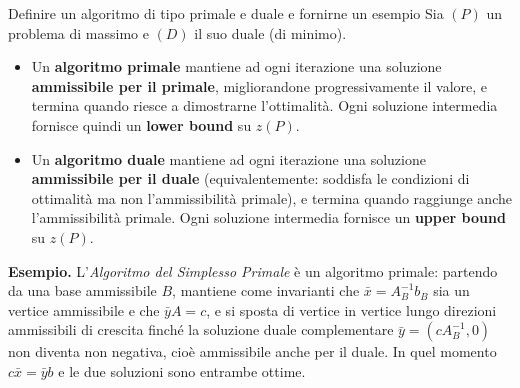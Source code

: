 \documentclass[12pt]{extarticle} %
\begin{document}
\begin{teoriabox}{Definire un algoritmo di tipo primale e duale e fornirne un esempio}
Sia $(P)$ un problema di massimo e $(D)$ il suo duale (di minimo).
\begin{itemize}
    \item Un \textbf{algoritmo primale} mantiene ad ogni iterazione una soluzione \textbf{ammissibile per il primale}, migliorandone progressivamente il valore, e termina quando riesce a dimostrarne l'ottimalità. Ogni soluzione intermedia fornisce quindi un \textbf{lower bound} su $z(P)$.
    \item Un \textbf{algoritmo duale} mantiene ad ogni iterazione una soluzione \textbf{ammissibile per il duale} (equivalentemente: soddisfa le condizioni di ottimalità ma non l'ammissibilità primale), e termina quando raggiunge anche l'ammissibilità primale. Ogni soluzione intermedia fornisce un \textbf{upper bound} su $z(P)$.
\end{itemize}
\textbf{Esempio.} L'\textit{Algoritmo del Simplesso Primale} è un algoritmo primale: partendo da una base ammissibile $B$, mantiene come invarianti che $\bar{x} = A_B^{-1}b_B$ sia un vertice ammissibile e che $\bar{y}A = c$, e si sposta di vertice in vertice lungo direzioni ammissibili di crescita finché la soluzione duale complementare $\bar{y} = (cA_B^{-1}, 0)$ non diventa non negativa, cioè ammissibile anche per il duale. In quel momento $c\bar{x} = \bar{y}b$ e le due soluzioni sono entrambe ottime.
\end{teoriabox}
\end{document}
